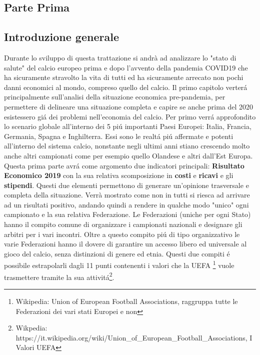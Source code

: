 \documentclass[
    corpo=12pt,
    oneside,
    evenboxes,
    tipotesi=triennale,
    stile=classica,
    oldstyle,
    autoretitolo,
    greek,
]{toptesi}
\begin{document}
\begin{interlinea}{1.5}

\part{Parte Prima}
\chapter{Introduzione generale}
Durante lo sviluppo di questa trattazione si andrà ad analizzare lo "stato di salute" del calcio europeo prima e dopo 
l'avvento della pandemia COVID19 che ha sicuramente stravolto la vita di tutti ed ha sicuramente arrecato non pochi danni 
economici al mondo, compreso quello del calcio.\newline
Il primo capitolo verter\'a principalmente sull'analisi della situazione economica pre-pandemia, per permettere di delineare una situazione
completa e capire se anche prima del 2020 esistessero gi\'a dei problemi nell'economia del calcio. Per primo verr\'a approfondito lo scenario
globale all'interno dei 5 pi\'u importanti Paesi Europei: Italia, Francia, Germania, Spagna e Inghilterra. Essi sono le realt\'a pi\'u 
affermate e potenti all'interno del sistema calcio, nonstante negli ultimi anni stiano crescendo molto anche altri campionati come per esempio
quello Olandese e altri dall'Est Europa. Questa prima parte avr\'a come argomento due indicatori principali: \textbf{Risultato Economico 2019} 
con la sua relativa scomposizione in \textbf{costi} e \textbf{ricavi} e gli \textbf{stipendi}. Questi due elementi
permettono di generare un'opinione trasversale e completa della situazione. Verrà mostrato come non in tutti 
si riesca ad arrivare ad un risultati positivo, andando quindi a rendere in qualche modo 
"unico" ogni campionato e la sua relativa Federazione. Le Federazioni (uniche per ogni Stato) hanno il compito
comune di organizzare i campionati nazionali e designare gli arbitri per i vari incontri. Oltre a questo compito pi\'u di tipo
organizzativo le varie Federazioni hanno il dovere di garantire un accesso libero ed universale al gioco del calcio, senza distinzioni
di genere ed etnia. Questi due compiti \'e possibile estrapolarli dagli 11 punti contenenti i valori che la UEFA
\footnote{Wikipedia: Union of European Football Associations, raggruppa tutte le Federazioni dei vari stati Europei e non} vuole
trasmettere tramite la sua attivit\'a\footnote{Wikpedia: https://it.wikipedia.org/wiki/Union\_of\_European\_Football\_Associations, I Valori UEFA}.\newline

\end{interlinea}
\end{document}
